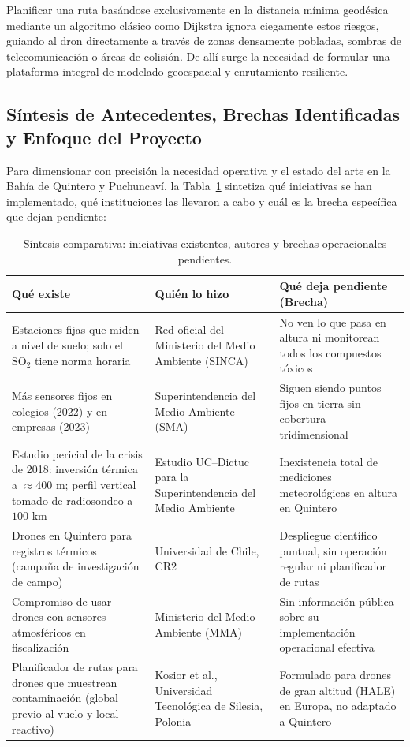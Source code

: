 \documentclass[letterpaper,12pt]{article}
\begin{document}
Planificar una ruta basándose exclusivamente en la distancia mínima geodésica mediante un algoritmo clásico como Dijkstra ignora ciegamente estos riesgos, guiando al dron directamente a través de zonas densamente pobladas, sombras de telecomunicación o áreas de colisión. De allí surge la necesidad de formular una plataforma integral de modelado geoespacial y enrutamiento resiliente.

\subsection{Síntesis de Antecedentes, Brechas Identificadas y Enfoque del Proyecto}
\label{subsec:sintesis_brechas}

Para dimensionar con precisión la necesidad operativa y el estado del arte en la Bahía de Quintero y Puchuncaví, la Tabla~\ref{tab:que_existe} sintetiza qué iniciativas se han implementado, qué instituciones las llevaron a cabo y cuál es la brecha específica que dejan pendiente:

\begin{table}[H]
\centering
\small
\caption{Síntesis comparativa: iniciativas existentes, autores y brechas operacionales pendientes.}
\label{tab:que_existe}
\begin{tabularx}{\linewidth}{p{4.8cm}p{4.2cm}X}
\toprule
\textbf{Qué existe} & \textbf{Quién lo hizo} & \textbf{Qué deja pendiente (Brecha)} \\
\midrule
Estaciones fijas que miden a nivel de suelo; solo el $\text{SO}_2$ tiene norma horaria & Red oficial del Ministerio del Medio Ambiente (SINCA) \cite{mma_sinca_2021} & No ven lo que pasa en altura ni monitorean todos los compuestos tóxicos \\
\addlinespace
Más sensores fijos en colegios (2022) y en empresas (2023) & Superintendencia del Medio Ambiente (SMA) \cite{sma_estrategia_2023} & Siguen siendo puntos fijos en tierra sin cobertura tridimensional \\
\addlinespace
Estudio pericial de la crisis de 2018: inversión térmica a $\approx 400\text{ m}$; perfil vertical tomado de radiosondeo a $100\text{ km}$ & Estudio UC--Dictuc para la Superintendencia del Medio Ambiente \cite{sma_dictuc} & Inexistencia total de mediciones meteorológicas en altura en Quintero \\
\addlinespace
Drones en Quintero para registros térmicos (campaña de investigación de campo) & Universidad de Chile, CR2 \cite{cr2_campana_2022} & Despliegue científico puntual, sin operación regular ni planificador de rutas \\
\addlinespace
Compromiso de usar drones con sensores atmosféricos en fiscalización & Ministerio del Medio Ambiente (MMA) \cite{mma_plan_2023} & Sin información pública sobre su implementación operacional efectiva \\
\addlinespace
Planificador de rutas para drones que muestrean contaminación (global previo al vuelo y local reactivo) & Kosior et al., Universidad Tecnológica de Silesia, Polonia \cite{kosior} & Formulado para drones de gran altitud (HALE) en Europa, no adaptado a Quintero \\
\bottomrule
\end{tabularx}
\end{table}
\end{document}
